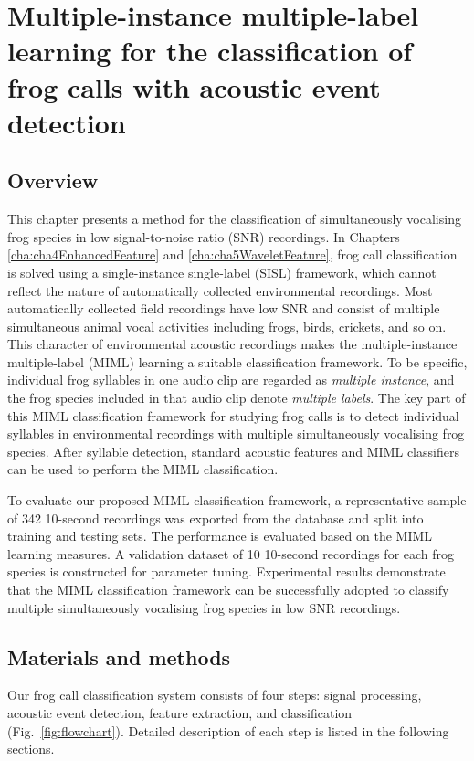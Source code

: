 
\chapter{Multiple-instance multiple-label learning for the classification of frog calls with acoustic event detection}
\label{cha:cha6MIML}


\section{Overview}
\label{sec:intro}

This chapter presents a method for the classification of simultaneously vocalising frog species in low signal-to-noise ratio (SNR) recordings. In Chapters \ref{cha:cha4EnhancedFeature} and \ref{cha:cha5WaveletFeature}, frog call classification is solved using a single-instance single-label (SISL) framework, which cannot reflect the nature of automatically collected environmental recordings. Most automatically collected field recordings have low SNR and consist of multiple simultaneous animal vocal activities including frogs, birds, crickets, and so on. This character of environmental acoustic recordings makes the multiple-instance multiple-label (MIML) learning a suitable classification framework. To be specific, individual frog syllables in one audio clip are regarded as \textit{multiple instance}, and the frog species included in that audio clip denote \textit{multiple labels}. 
The key part of this MIML classification framework for studying frog calls is to detect individual syllables in environmental recordings with multiple simultaneously vocalising frog species. After syllable detection, standard acoustic features and MIML classifiers can be used to perform the MIML classification.


To evaluate our proposed MIML classification framework, a representative sample of 342 10-second recordings was exported from the database and split into training and testing sets. The performance is evaluated based on the MIML learning measures. A validation dataset of 10 10-second recordings for each frog species is constructed for parameter tuning.
Experimental results demonstrate that the MIML classification framework can be successfully adopted to classify multiple simultaneously vocalising frog species in low SNR recordings.



\section{Materials and methods}
Our frog call classification system consists of
four steps: signal processing, acoustic event detection, feature
extraction, and classification (Fig.~\ref{fig:flowchart}). Detailed description of each step is listed in the following sections. 


